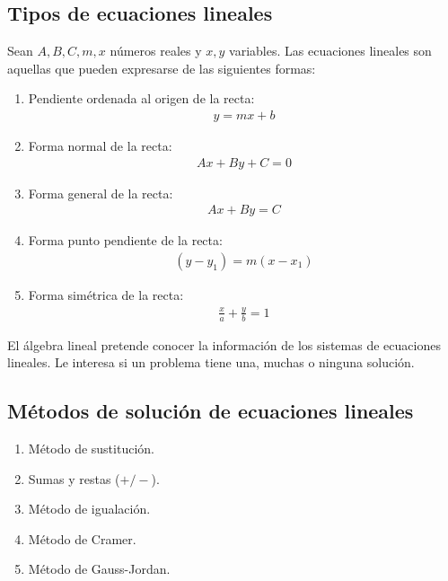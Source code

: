 \subsection*{Tipos de ecuaciones lineales}
\label{sec:0_tipos_de_ecuaciones_lineales}
\setcounter{equation}{0}
\setcounter{definition}{1}

Sean $A, B, C, m, x$ números reales y $x, y$ variables. Las ecuaciones lineales son aquellas que pueden expresarse de las siguientes formas:

\begin{enumerate}
\item Pendiente ordenada al origen de la recta:
\begin{align*}
    y = mx + b
\end{align*}
\item Forma normal de la recta:
\begin{align*}
    Ax + By + C = 0
\end{align*}
\item Forma general de la recta:
\begin{align*}
    Ax + By = C
\end{align*}
\item Forma punto pendiente de la recta:
\begin{align*}
    (y - y_1) = m(x - x_1)
\end{align*}
\item Forma simétrica de la recta:
\begin{align*}
    \frac{x}{a} + \frac{y}{b} = 1
\end{align*}
\end{enumerate}

\begin{note}
\end{note}

El álgebra lineal pretende conocer la información de los sistemas de ecuaciones lineales. Le interesa si un problema tiene una, muchas o ninguna solución.

\subsection*{Métodos de solución de ecuaciones lineales}
\label{sec:0_metodos_de_solucion_de_ecuaciones_lineales}

\begin{enumerate}
    \item Método de sustitución.
    \item Sumas y restas ($+/-$).
    \item Método de igualación.
    \item Método de Cramer.
    \item Método de Gauss-Jordan.
\end{enumerate}

